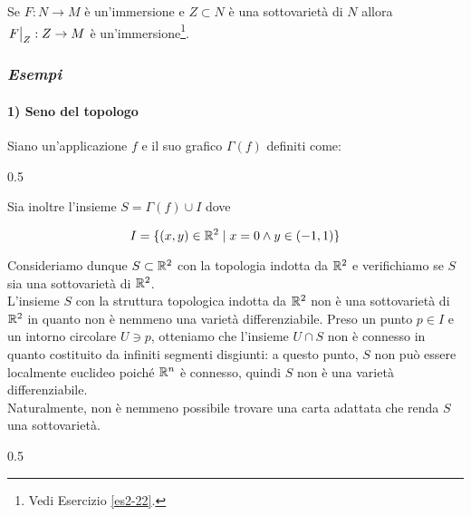 \begin{remark}
	Se $ F : N \to M $ è un'immersione e $ Z \subset N $ è una sottovarietà di $ N $ allora $ \eval{F}_{Z} : Z \to M $ è un'immersione\footnote{%
		Vedi Esercizio \ref{es2-22}.%
	}.
\end{remark}

\subsubsection{\textit{Esempi}}

\paragraph{1) Seno del topologo}

Siano un'applicazione $ f $ e il suo grafico $ \Gamma(f) $ definiti come:

	{0.5}{%
			}

Sia inoltre l'insieme $ S = \Gamma(f) \cup I $ dove

\begin{equation}
	I = \{ (x,y) \in \mathbb{R}^{2} \mid x=0 \wedge y \in (-1,1) \}
\end{equation}

Consideriamo dunque $ S \subset \mathbb{R}^{2} $ con la topologia indotta da $ \mathbb{R}^{2} $ e verifichiamo se $ S $ sia una sottovarietà di $ \mathbb{R}^{2} $.\\
L'insieme $ S $ con la struttura topologica indotta da $ \mathbb{R}^{2} $ non è una sottovarietà di $ \mathbb{R}^{2} $ in quanto non è nemmeno una varietà differenziabile. Preso un punto $ p \in I $ e un intorno circolare $ U \ni p $, otteniamo che l'insieme $ U \cap S $ non è connesso in quanto costituito da infiniti segmenti disgiunti: a questo punto, $ S $ non può essere localmente euclideo poiché $ \mathbb{R}^{n} $ è connesso, quindi $ S $ non è una varietà differenziabile.\\
Naturalmente, non è nemmeno possibile trovare una carta adattata che renda $ S $ una sottovarietà.

	{0.5}{%
			}

